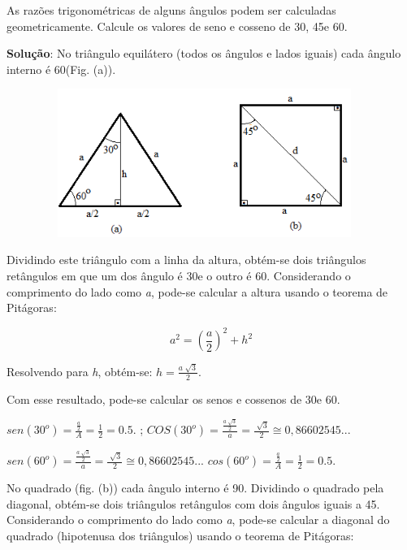 \begin{texemplo}
As razões trigonométricas de alguns ângulos podem ser calculadas geometricamente. Calcule os valores de seno e cosseno de 30\degree, 45\degree e 60\degree.

\textbf{Solução}: No triângulo equilátero (todos os ângulos e lados iguais) cada ângulo interno é 60\degree  (Fig. (a)).

\begin{figure}[H]
    \begin{Center}
        \includegraphics[width=4.24in,height=1.9in]{capitulos/trigonometria_e_funcoes_trigonometricas/media/image22.png}
    \end{Center}
\end{figure}

Dividindo este triângulo com a linha da altura, obtém-se dois triângulos retângulos em que um dos ângulo é 30\degree  e o outro é 60\degree . Considerando o comprimento do lado como \textit{a}, pode-se calcular a altura usando o teorema de Pitágoras:

 \[ a^{2}= \left( \frac{a}{2} \right) ^{2}+h^{2} \]

Resolvendo para \textit{h}, obtém-se:  \( h=\frac{a\sqrt[]{3}}{2}. \)

Com esse resultado, pode-se calcular os senos e cossenos de 30\degree e 60\degree.

 \( sen \left( 30^{o} \right) =\frac{\frac{a}{2}}{A}=\frac{1}{2}=0.5. \)     ; \tab     \( COS \left( 30^{o} \right) =\frac{\frac{a\sqrt[]{3}}{2}}{a}=\frac{\sqrt[]{3}}{2}  \cong 0,86602545... \)

 \( sen \left( 60^{o} \right) =\frac{\frac{a\sqrt[]{3}}{2}}{a}=\frac{\sqrt[]{3}}{2}  \cong 0,86602545... \) \tab  \( cos \left( 60^{o} \right) =\frac{\frac{a}{2}}{A}=\frac{1}{2}=0.5. \)

No quadrado (fig. (b)) cada ângulo interno é 90\degree. Dividindo o quadrado pela diagonal, obtém-se dois triângulos retângulos com dois ângulos iguais a 45\degree. Considerando o comprimento do lado como \textit{a}, pode-se calcular a diagonal do quadrado (hipotenusa dos triângulos) usando o teorema de Pitágoras:


\end{texemplo}
